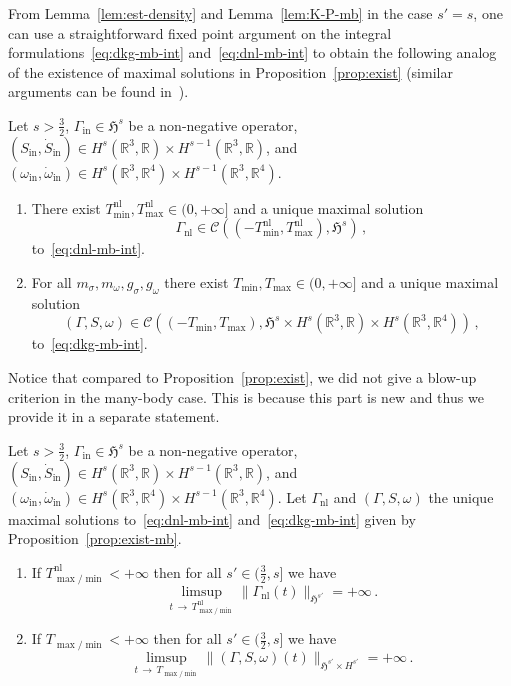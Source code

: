 \documentclass[AHL,Unicode,longabstracts,published]{cedram}
\newcommand{\rmin}{\mathrm{in}}
\newcommand{\nl}{\mathrm{nl}}
\newcommand{\cC}{\mathcal{C}}
\newcommand\R{\mathbb{R}}
\newcommand{\gH}{\mathfrak{H}}
\newcommand*{\romanenumi}{\renewcommand*{\theenumi}{\roman{enumi}}}
\begin{document}
From Lemma~\ref{lem:est-density} and Lemma~\ref{lem:K-P-mb} in the case $s'=s$, one can use a straightforward fixed point argument on the integral formulations~\eqref{eq:dkg-mb-int} and~\eqref{eq:dnl-mb-int} to obtain the following analog of the existence of maximal solutions in Proposition~\ref{prop:exist} (similar arguments can be found in~\cite[Theorem~3]{LewSab-13a}).

\begin{prop}\label{prop:exist-mb}
Let $s>\tfrac32$, $\Gamma_\rmin\in \gH^s$ be a non-negative operator, $(S_\rmin,\dot{S}_\rmin)\in H^s(\R^3, \R)\times H^{s-1}(\R^3, \R)$, and $(\omega_\rmin,\dot{\omega}_\rmin)\in H^s(\R^3, \R^4)\times H^{s-1}(\R^3, \R^4)$.
\begin{enumerate}\romanenumi
\item\label{pt1.prop-mb}
There exist $T_{\min}^{\nl}, T_{\max}^{\nl}\in(0,+\infty]$ and a unique maximal solution
\[
\Gamma_{\nl}\in\cC\left(\left(-T_{\min}^{\nl}, T_{\max}^{\nl}\right),\gH^s\right)\,,
\]
to~\eqref{eq:dnl-mb-int}.
\item\label{pt2.prop-mb}
For all $m_\sigma, m_\omega, g_\sigma, g_\omega$ there exist $T_{\min}, T_{\max}\in(0,+\infty]$ and a unique maximal solution
\[
(\Gamma,S,\omega)\in \cC\left(\left(-T_{\min}, T_{\max}\right),\gH^s\times H^s\left(\R^3,\R\right)\times H^s\left(\R^3, \R^4\right)\right)\,,
\]
to~\eqref{eq:dkg-mb-int}.
\end{enumerate}
\end{prop}

Notice that compared to Proposition~\ref{prop:exist}, we did not give a blow-up criterion in the many-body case. This is because this part is new and thus we provide it in a separate statement.

\begin{lemm}\label{lem:blowup-crit-mb}
Let $s>\tfrac32$, $\Gamma_\rmin\in \gH^s$ be a non-negative operator, $(S_\rmin,\dot{S}_\rmin)\in H^s(\R^3, \R)\times H^{s-1}(\R^3, \R)$, and $(\omega_\rmin,\dot{\omega}_\rmin)\in H^s(\R^3, \R^4)\times H^{s-1}(\R^3, \R^4)$. Let $\Gamma_{\nl}$ and $(\Gamma,S,\omega)$ the unique maximal solutions to~\eqref{eq:dnl-mb-int} and~\eqref{eq:dkg-mb-int} given by Proposition~\ref{prop:exist-mb}.
\begin{enumerate}\romanenumi
\item If $T_{\max/\min}^{\nl}<+\infty$ then for all $s'\in(\tfrac32,s]$ we have
\[
\limsup_{t\,\to\,T_{\max/\min}^{\nl}}\|\Gamma_{\nl}(t)\|_{\gH^{s'}}= +\infty\,.
\]
\item If $T_{\max/\min}<+\infty$ then for all $s'\in(\tfrac32,s]$ we have
\begin{equation}\label{eq:blowup-crit-mb}
\limsup_{t\,\to\,T_{\max/\min}}\|(\Gamma,S,\omega)(t)\|_{\gH^{s'}\times H^{s'}} = +\infty\,. 
\end{equation}
\end{enumerate}
\end{lemm}
\end{document}

